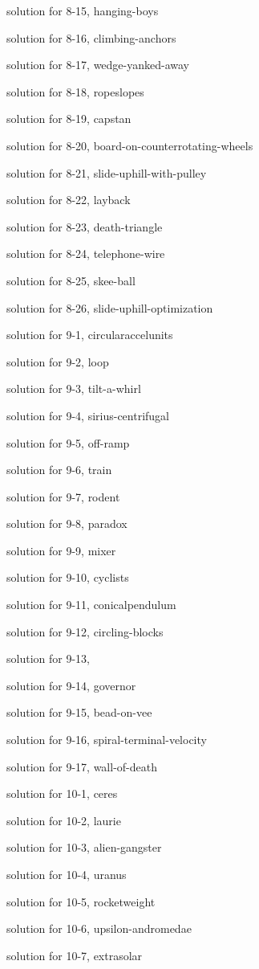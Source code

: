 \documentclass{problems}
\begin{document}
solution for 8-15, hanging-boys

solution for 8-16, climbing-anchors

solution for 8-17, wedge-yanked-away

solution for 8-18, ropeslopes

solution for 8-19, capstan

solution for 8-20, board-on-counterrotating-wheels

solution for 8-21, slide-uphill-with-pulley

solution for 8-22, layback

solution for 8-23, death-triangle

solution for 8-24, telephone-wire

solution for 8-25, skee-ball

solution for 8-26, slide-uphill-optimization

solution for 9-1, circularaccelunits

solution for 9-2, loop

solution for 9-3, tilt-a-whirl

solution for 9-4, sirius-centrifugal

solution for 9-5, off-ramp

solution for 9-6, train

solution for 9-7, rodent

solution for 9-8, paradox

solution for 9-9, mixer

solution for 9-10, cyclists

solution for 9-11, conicalpendulum

solution for 9-12, circling-blocks

solution for 9-13, 

solution for 9-14, governor

solution for 9-15, bead-on-vee

solution for 9-16, spiral-terminal-velocity

solution for 9-17, wall-of-death

solution for 10-1, ceres

solution for 10-2, laurie

solution for 10-3, alien-gangster

solution for 10-4, uranus

solution for 10-5, rocketweight

solution for 10-6, upsilon-andromedae

solution for 10-7, extrasolar
\end{document}
